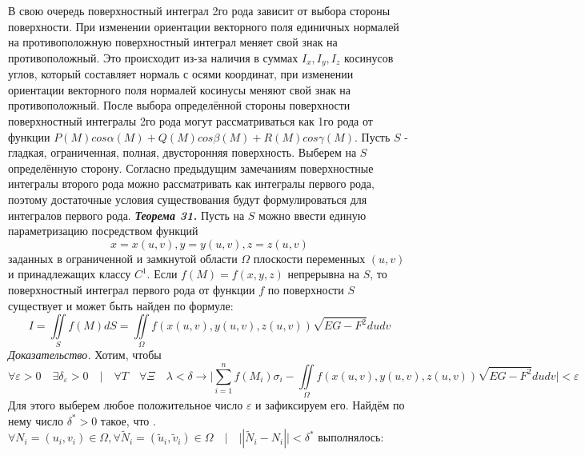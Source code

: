\documentclass[12pt,a4paper]{article}
\begin{document}
	\newline
	В свою очередь поверхностный интеграл 2го рода зависит от выбора стороны поверхности. При изменении ориентации векторного поля единичных нормалей на противоположную поверхностный интеграл меняет свой знак на противоположный. Это происходит из-за наличия в суммах $I_{x}, I_{y}, I_{z}$ косинусов углов, который составляет нормаль с осями координат, при изменении ориентации векторного поля нормалей косинусы меняют свой знак на противоположный. После выбора определённой стороны поверхности поверхностный интегралы 2го рода могут рассматриваться как 1го рода от функции $P(M)cos\alpha(M) + Q(M)cos\beta(M) + R(M)cos\gamma(M)$.
	\newline
	\newline
	Пусть $S$ - гладкая, ограниченная, полная, двусторонняя поверхность. Выберем на $S$ определённую сторону. Согласно предыдущим замечаниям поверхностные интегралы второго рода можно рассматривать как интегралы первого рода, поэтому достаточные условия существования будут формулироваться для интегралов первого рода. 
	\newline
	\newline
	\textbf{\textit{Теорема 31.}} Пусть на $S$ можно ввести единую параметризацию посредством функций \[ x = x(u,v) , y = y(u,v), z = z(u,v)\] заданных в ограниченной и замкнутой области $\Omega$ плоскости переменных $(u,v)$  и принадлежащих классу $C^{1}$. Если $f(M) = f(x,y,z)$ непрерывна на $S$, то поверхностный интеграл первого рода от функции $f$ по поверхности $S$ существует и может быть найден по формуле:
	\begin{equation}\label{IntForm}
		I = \iint\limits_{S} f(M)dS = \iint\limits_{\Omega} f(x(u,v), y(u,v), z(u,v)) \sqrt{EG - F^2} dudv
	\end{equation}
	\newline
	\textit{Доказательство.}
	\newline
	Хотим, чтобы
	\[ \forall \varepsilon > 0 \quad \exists \delta_{\varepsilon} > 0 \quad|\quad \forall T \quad\forall \Xi \quad\lambda < \delta \rightarrow |\sum\limits_{i=1}^n f(M_{i})\sigma_{i} - \iint\limits_{\Omega} f(x(u,v), y(u,v), z(u,v)) \sqrt{EG - F^2} dudv| < \varepsilon \]
	Для этого выберем любое положительное число $\varepsilon$ и зафиксируем его. Найдём по нему число $\delta^{*} > 0$ такое, что
	. $\forall N_{i} = (u_{i}, v_{i}) \in \Omega, \forall \tilde N_{i} = (\tilde u_{i}, \tilde v_{i}) \in \Omega \quad | \quad ||\tilde N_{i} - N_{i}|| < \delta^{*}$ выполнялось: 
\end{document}
